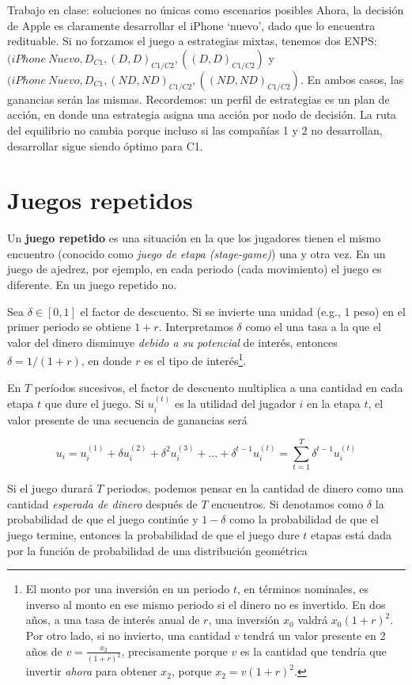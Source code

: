 \documentclass[12pt]{scrartcl}
\begin{document}
\begin{exbox}{Trabajo en clase: soluciones no únicas como escenarios posibles}
Ahora, la decisión de Apple es claramente desarrollar el iPhone `nuevo', dado que lo encuentra redituable. Si no forzamos el juego a estrategias mixtas, tenemos dos ENPS: ${(iPhone~Nuevo, D_{C1}, (D, D)_{C1/C2}, ((D, D)_{C1/C2})}$ y ${(iPhone~Nuevo, D_{C1}, (ND, ND)_{C1/C2}, ((ND, ND)_{C1/C2})}$. En ambos casos, las ganancias serán las mismas. Recordemos: un perfil de estrategias es un plan de acción, en donde una estrategia asigna una acción por nodo de decisión. La ruta del equilibrio no cambia porque incluso si las compañías 1 y 2 no desarrollan, desarrollar sigue siendo óptimo para C1.


\end{exbox}


\section{Juegos repetidos}

Un \textbf{juego repetido} es una situación en la que los jugadores tienen el mismo encuentro (conocido como \textit{juego de etapa (stage-game)}) una y otra vez. En un juego de ajedrez, por ejemplo, en cada periodo (cada movimiento) el juego es diferente. En un juego repetido no.

Sea $\delta \in [0, 1]$ el factor de descuento. Si se invierte una unidad (e.g., 1 peso) en el primer periodo se obtiene $1 + r$. Interpretamos $\delta$ como el una tasa a la que el valor del dinero disminuye \textit{debido a su potencial} de interés, entonces $\delta = 1/(1+r)$, en donde $r$ es el tipo de interés\footnote{
El monto por una inversión en un periodo $t$, en términos nominales, es inverso al monto en ese mismo periodo si el dinero no es invertido. En dos años, a una tasa de interés anual de $r$, una inversión $x_0$ valdrá $x_0(1+r)^2$. Por otro lado, si no invierto, una cantidad $v$ tendrá un valor presente en 2 años de $v=\frac{x_2}{(1+r)^2}$, precisamente porque $v$ es la cantidad que tendría que invertir \textit{ahora} para obtener $x_2$, porque $x_2=v(1+r)^2$.
}. 

En $T$ períodos sucesivos, el factor de descuento multiplica a una cantidad en cada etapa $t$ que dure el juego. Si $u_i^{(t)}$ es la utilidad del jugador $i$ en la etapa $t$, el valor presente de una secuencia de ganancias será

\[ 
    u_i = u_i^{(1)} + \delta u_i^{(2)} + \delta^2 u_i^{(3)} + \dots + \delta^{t-1} u_i^{(t)} = \sum_{t=1}^{T}\delta^{t-1} u_i^{(t)}
\]

Si el juego durará $T$ periodos, podemos pensar en la cantidad de dinero como una cantidad \textit{esperada de dinero} después de $T$ encuentros. Si denotamos como $\delta$ la probabilidad de que el juego continúe y $1 - \delta$ como la probabilidad de que el juego termine, entonces la probabilidad de que el juego dure $t$ etapas está dada por la función de probabilidad de una distribución geométrica
\end{document}

